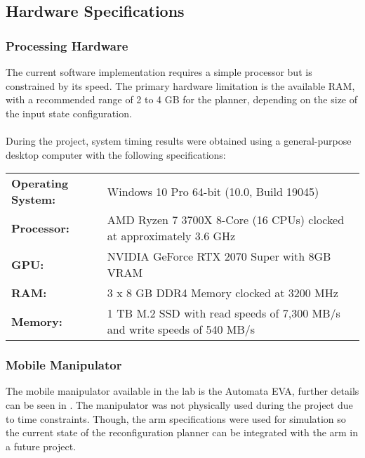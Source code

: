 \subsection{Hardware Specifications}\label{hardware}
\subsubsection{Processing Hardware}
The current software implementation requires a simple processor but is constrained by its speed. The primary hardware limitation is the available RAM, with a recommended range of 2 to 4 GB for the planner, depending on the size of the input state configuration.
\\\\
During the project, system timing results were obtained using a general-purpose desktop computer with the following specifications:
\\
\begin{tabularx}{1\textwidth}{ p{} p{} }
	\textbf{Operating System:} 	& Windows 10 Pro 64-bit (10.0, Build 19045)\\
	\textbf{Processor:} 		& AMD Ryzen 7 3700X 8-Core (16 CPUs) clocked at approximately 3.6 GHz\\
	\textbf{GPU:} 				& NVIDIA GeForce RTX 2070 Super with 8GB VRAM\\
	\textbf{RAM:} 				& 3 x 8 GB DDR4 Memory clocked at 3200 MHz\\
	\textbf{Memory:} 			& 1 TB M.2 SSD with read speeds of 7,300 MB/s and write speeds of 540 MB/s\\
\end{tabularx}

\subsubsection{Mobile Manipulator}
The mobile manipulator available in the lab is the Automata EVA, further details can be seen in . The manipulator was not physically used during the project due to time constraints. Though, the arm specifications were used for simulation so the current state of the reconfiguration planner can be integrated with the arm in a future project.
